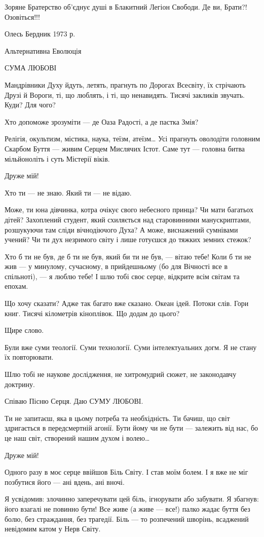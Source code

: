 Зоряне Братерство об’єднує душі в Блакитний Легіон Свободи. Де ви, Брати?!
Озовіться!!!

Олесь Бердник 1973 р.

Альтернативна Еволюція

СУМА ЛЮБОВІ

Мандрівники Духу йдуть, летять, прагнуть по Дорогах Всесвіту, їх стрічають
Друзі й Вороги, ті, що люблять, і ті, що ненавидять. Тисячі закликів звучать.
Куди? Для чого?

Хто допоможе зрозуміти — де Оаза Радості, а де пастка Змія?

Релігія, окультизм, містика, наука, теїзм, атеїзм… Усі прагнуть оволодіти
головним Скарбом Буття — живим Серцем Мислячих Істот. Саме тут — головна битва
мільйоноліть і суть Містерії віків.

Друже мій!

Хто ти — не знаю. Який ти — не відаю.

Може, ти юна дівчинка, котра очікує свого небесного принца? Чи мати багатьох
дітей? Захоплений студент, який схиляється над старовинними манускриптами,
розшукуючи там сліди вічнодіючого Духа? А може, виснажений сумнівами учений? Чи
ти дух незримого світу і лише готуєшся до тяжких земних стежок?

Хто б ти не був, де б ти не був, який би ти не був, — вітаю тебе! Коли б ти не
жив — у минулому, сучасному, в прийдешньому (бо для Вічності все в спільноті),
— я люблю тебе! І шлю тобі своє серце, відкрите всім світам та епохам.

Що хочу сказати? Адже так багато вже сказано. Океан ідей. Потоки слів. Гори книг. Тисячі кілометрів кіноплівок. Що додам до цього?

Щире слово.

Були вже суми теології. Суми технології. Суми інтелектуальних догм. Я не стану
їх повторювати.

Шлю тобі не наукове дослідження, не хитромудрий сюжет, не законодавчу доктрину.

Співаю Пісню Серця. Даю СУМУ ЛЮБОВІ.

Ти не запитаєш, яка в цьому потреба та необхідність. Ти бачиш, що світ
здригається в передсмертній агонії. Бути йому чи не бути — залежить від нас, бо
це наш світ, створений нашим духом і волею…

Друже мій!

Одного разу в моє серце ввійшов Біль Світу. І став моїм болем. І я вже не міг
позбутися його — ані вдень, ані вночі.

Я усвідомив: злочинно заперечувати цей біль, ігнорувати або забувати. Я
збагнув: його взагалі не повинно бути! Все живе (а живе — все!) палко жадає
буття без болю, без страждання, без трагедії. Біль — то розпечений шворінь,
всаджений невідомим катом у Нерв Світу.

